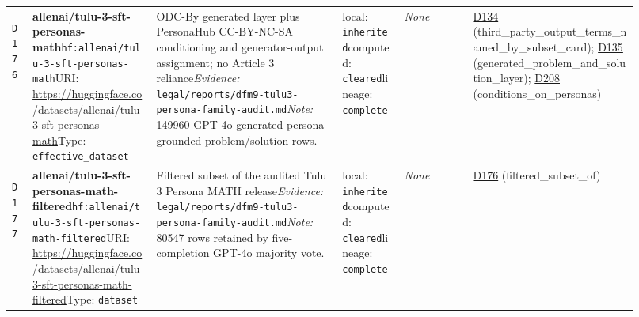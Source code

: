 \documentclass[9pt,a4paper]{article}
\newcommand{\depid}[1]{\hypertarget{dep:#1}{\texttt{#1}}}
\begin{document}
\begin{landscape}
\begin{longtable}{@{}L{0.035\linewidth}L{0.185\linewidth}L{0.27\linewidth}L{0.09\linewidth}L{0.10\linewidth}L{0.24\linewidth}@{}}
\depid{D176} & \textbf{allenai/tulu-3-sft-personas-math}\newline \nolinkurl{hf:allenai/tulu-3-sft-personas-math}\newline URI: \url{https://huggingface.co/datasets/allenai/tulu-3-sft-personas-math}\newline Type: \texttt{effective\_dataset} & ODC-By generated layer plus PersonaHub CC-BY-NC-SA conditioning and generator-output assignment; no Article 3 reliance\newline \textit{Evidence:} \nolinkurl{legal/reports/dfm9-tulu3-persona-family-audit.md}\newline \textit{Note:} 149960 GPT-4o-generated persona-grounded problem/solution rows. & local: \texttt{inherited}\newline computed: \texttt{cleared}\newline lineage: \texttt{complete} & \textit{None} & \hyperlink{dep:D134}{D134} (third\_party\_output\_terms\_named\_by\_subset\_card); \hyperlink{dep:D135}{D135} (generated\_problem\_and\_solution\_layer); \hyperlink{dep:D208}{D208} (conditions\_on\_personas) \\
\depid{D177} & \textbf{allenai/tulu-3-sft-personas-math-filtered}\newline \nolinkurl{hf:allenai/tulu-3-sft-personas-math-filtered}\newline URI: \url{https://huggingface.co/datasets/allenai/tulu-3-sft-personas-math-filtered}\newline Type: \texttt{dataset} & Filtered subset of the audited Tulu 3 Persona MATH release\newline \textit{Evidence:} \nolinkurl{legal/reports/dfm9-tulu3-persona-family-audit.md}\newline \textit{Note:} 80547 rows retained by five-completion GPT-4o majority vote. & local: \texttt{inherited}\newline computed: \texttt{cleared}\newline lineage: \texttt{complete} & \textit{None} & \hyperlink{dep:D176}{D176} (filtered\_subset\_of) \\

\end{longtable}
\end{landscape}
\end{document}
